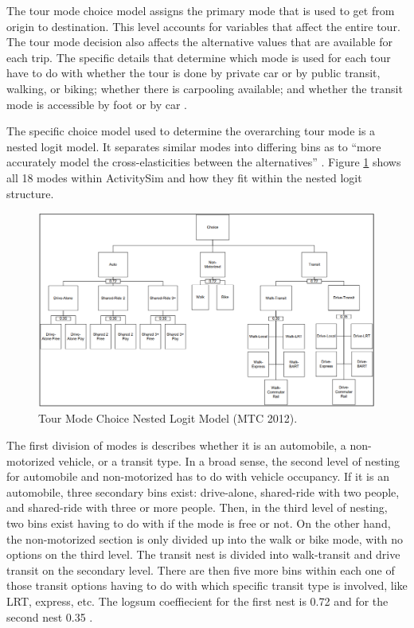 \documentclass[3p, authoryear, review]{elsarticle} %
\begin{document}
The tour mode choice model assigns the primary mode that is used to get from origin to destination. This level accounts for variables that affect the entire tour. The tour mode decision also affects the alternative values that are available for each trip. The specific details that determine which mode is used for each tour have to do with whether the tour is done by private car or by public transit, walking, or biking; whether there is carpooling available; and whether the transit mode is accessible by foot or by car \citep{mtc12}.

The specific choice model used to determine the overarching tour mode is a nested logit model. It separates similar modes into differing bins as to ``more accurately model the cross-elasticities between the alternatives'' \citep{mtc12}. Figure \ref{fig:fig1} shows all 18 modes within ActivitySim and how they fit within the nested logit structure.

\begin{figure}

{\centering \includegraphics[width=1\linewidth]{pics/tour_nest} 

}

\caption{Tour Mode Choice Nested Logit Model (MTC 2012).}\label{fig:fig1}
\end{figure}

The first division of modes is describes whether it is an automobile, a non-motorized vehicle, or a transit type. In a broad sense, the second level of nesting for automobile and non-motorized has to do with vehicle occupancy. If it is an automobile, three secondary bins exist: drive-alone, shared-ride with two people, and shared-ride with three or more people. Then, in the third level of nesting, two bins exist having to do with if the mode is free or not. On the other hand, the non-motorized section is only divided up into the walk or bike mode, with no options on the third level. The transit nest is divided into walk-transit and drive transit on the secondary level. There are then five more bins within each one of those transit options having to do with which specific transit type is involved, like LRT, express, etc. The logsum coeffiecient for the first nest is 0.72 and for the second nest 0.35 \citep{mtc12}.
\end{document}
